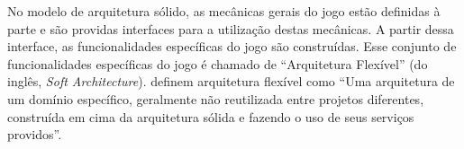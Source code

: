 No modelo de arquitetura sólido, as mecânicas gerais do jogo estão definidas à parte e são providas interfaces para a utilização destas mecânicas. A partir dessa interface, as funcionalidades específicas do jogo são construídas. Esse conjunto de funcionalidades específicas do jogo é chamado de “Arquitetura Flexível” (do inglês, \textit{Soft Architecture}).  definem arquitetura flexível como “Uma arquitetura de um domínio específico, geralmente não reutilizada entre projetos diferentes, construída em cima da arquitetura sólida e fazendo o uso de seus serviços providos”.

